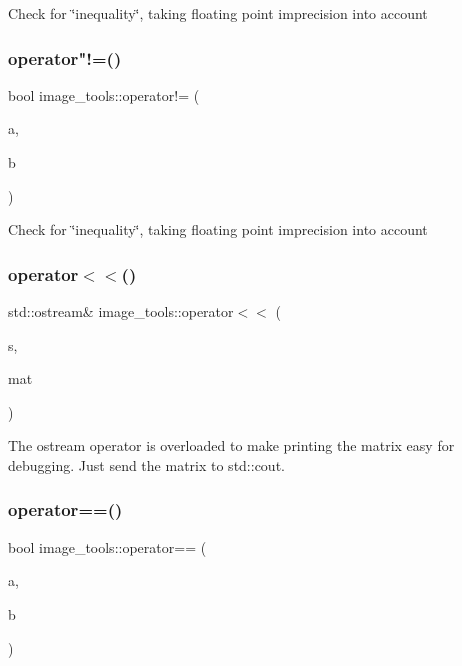 Check for \char`\"{}inequality\char`\"{}, taking floating point imprecision into account \mbox{\label{namespaceimage__tools_a83c5e53f2317f61ef03f91ca667145cf}} 
\subsubsection{\texorpdfstring{operator"!=()}{operator!=()}\hspace{0.1cm}{\footnotesize\ttfamily [2/2]}}
{\footnotesize\ttfamily bool image\+\_\+tools\+::operator!= (\begin{DoxyParamCaption}\item[{const \hyperlink{classimage__tools_1_1PixelBuffer}{Pixel\+Buffer} \&}]{a,  }\item[{const \hyperlink{classimage__tools_1_1PixelBuffer}{Pixel\+Buffer} \&}]{b }\end{DoxyParamCaption})}

Check for \char`\"{}inequality\char`\"{}, taking floating point imprecision into account \mbox{\label{namespaceimage__tools_ae217665b898f2dec652e5ea51d0eb206}} 
\subsubsection{\texorpdfstring{operator$<$$<$()}{operator<<()}}
{\footnotesize\ttfamily std\+::ostream\& image\+\_\+tools\+::operator$<$$<$ (\begin{DoxyParamCaption}\item[{std\+::ostream \&}]{s,  }\item[{const \hyperlink{classimage__tools_1_1FloatMatrix}{Float\+Matrix} \&}]{mat }\end{DoxyParamCaption})}

The ostream operator is overloaded to make printing the matrix easy for debugging. Just send the matrix to std\+::cout. \mbox{\label{namespaceimage__tools_aa86e60308b4cc57bddad07333db1e2ea}} 
\subsubsection{\texorpdfstring{operator==()}{operator==()}\hspace{0.1cm}{\footnotesize\ttfamily [1/2]}}
{\footnotesize\ttfamily bool image\+\_\+tools\+::operator== (\begin{DoxyParamCaption}\item[{const \hyperlink{classimage__tools_1_1ColorData}{Color\+Data} \&}]{a,  }\item[{const \hyperlink{classimage__tools_1_1ColorData}{Color\+Data} \&}]{b }\end{DoxyParamCaption})}

